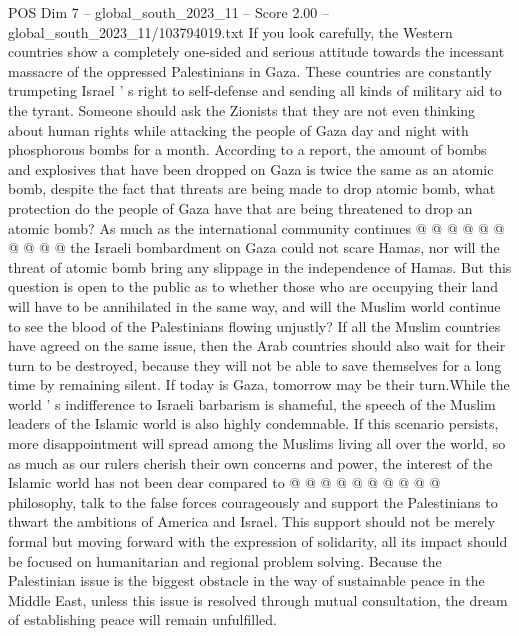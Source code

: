 \begin{textsample}{POS Dim 7 – global\_south\_2023\_11 – Score 2.00 – global\_south\_2023\_11/103794019.txt}
If you look carefully, the Western countries show a completely one-sided and serious attitude towards the incessant massacre of the oppressed Palestinians in Gaza.
These countries are constantly trumpeting Israel ' s right to self-defense and sending all kinds of military aid to the tyrant.
Someone should ask the Zionists that they are not even thinking about human rights while attacking the people of Gaza day and night with phosphorous bombs for a month.
According to a report, the amount of bombs and explosives that have been dropped on Gaza is twice the same as an atomic bomb, despite the fact that threats are being made to drop atomic bomb, what protection do the people of Gaza have that are being threatened to drop an atomic bomb?
As much as the international community continues @ @ @ @ @ @ @ @ @ @ the Israeli bombardment on Gaza could not scare Hamas, nor will the threat of atomic bomb bring any slippage in the independence of Hamas.
But this question is open to the public as to whether those who are occupying their land will have to be annihilated in the same way, and will the Muslim world continue to see the blood of the Palestinians flowing unjustly?
If all the Muslim countries have agreed on the same issue, then the Arab countries should also wait for their turn to be destroyed, because they will not be able to save themselves for a long time by remaining silent.
If today is Gaza, tomorrow may be their turn.While the world ' s indifference to Israeli barbarism is shameful, the speech of the Muslim leaders of the Islamic world is also highly condemnable.
If this scenario persists, more disappointment will spread among the Muslims living all over the world, so as much as our rulers cherish their own concerns and power, the interest of the Islamic world has not been dear compared to @ @ @ @ @ @ @ @ @ @ philosophy, talk to the false forces courageously and support the Palestinians to thwart the ambitions of America and Israel.
This support should not be merely formal but moving forward with the expression of solidarity, all its impact should be focused on humanitarian and regional problem solving.
Because the Palestinian issue is the biggest obstacle in the way of sustainable peace in the Middle East, unless this issue is resolved through mutual consultation, the dream of establishing peace will remain unfulfilled.

\end{textsample}
